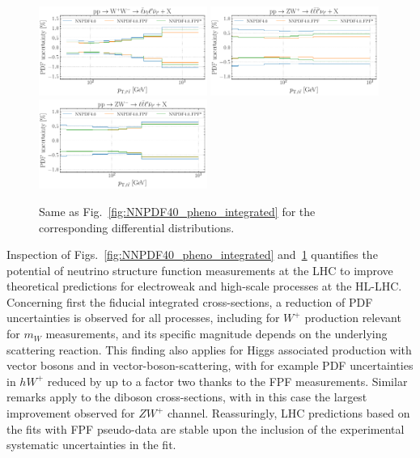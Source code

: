 \begin{figure}[t]
\includegraphics[width=0.49\textwidth]{plots/LHCpheno/NNPDF_WPWM_14TEV_40_PHENO-global.pdf}
\includegraphics[width=0.49\textwidth]{plots/LHCpheno/NNPDF_WPZ_14TEV_40_PHENO-global.pdf}
\includegraphics[width=0.49\textwidth]{plots/LHCpheno/NNPDF_WMZ_14TEV_40_PHENO-global.pdf}
\caption{Same as Fig.~\ref{fig:NNPDF40_pheno_integrated}
for the corresponding differential distributions.
%
}
\label{fig:NNPDF40_pheno_differential}
\end{figure}

Inspection of Figs.~\ref{fig:NNPDF40_pheno_integrated} and~\ref{fig:NNPDF40_pheno_differential}
quantifies the potential of neutrino structure function measurements at the LHC
to improve theoretical predictions for electroweak and high-scale processes at the HL-LHC.
%
Concerning first the fiducial integrated cross-sections, a reduction of PDF
uncertainties is observed for all processes,
including for $W^+$ production relevant for $m_W$ measurements, and its specific  magnitude depends
on the underlying scattering reaction.
%
This finding also applies for Higgs associated production with vector bosons and in vector-boson-scattering,
with for example
PDF uncertainties in $hW^+$ reduced by up to a factor two thanks to the FPF measurements.
%
Similar remarks apply to the diboson cross-sections, with in this case the largest
improvement observed for $ZW^+$ channel.
%
Reassuringly, LHC predictions based on the fits with FPF pseudo-data are stable
upon the inclusion of the experimental systematic uncertainties in the fit.

